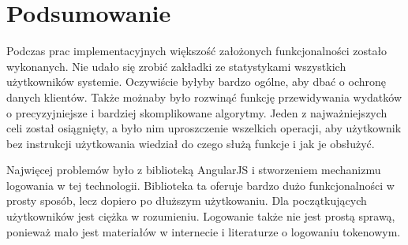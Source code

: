 \documentclass[10pt,titlepage]{article}
\begin{document}
\section*{Podsumowanie}
Podczas prac implementacyjnych większość założonych funkcjonalności zostało wykonanych. Nie udało się zrobić zakładki ze statystykami wszystkich użytkowników systemie. Oczywiście byłyby bardzo ogólne, aby dbać o ochronę danych klientów. Także możnaby było rozwinąć funkcję przewidywania wydatków o precyzyjniejsze i bardziej skomplikowane algorytmy. Jeden z najważniejszych celi został osiągnięty, a było nim uproszczenie wszelkich operacji, aby użytkownik bez instrukcji użytkowania wiedział do czego służą funkcje i jak je obsłużyć.
\par Najwięcej problemów było z biblioteką AngularJS i stworzeniem mechanizmu logowania w tej technologii. Biblioteka ta oferuje bardzo dużo funkcjonalności w prosty sposób, lecz dopiero po dłuższym użytkowaniu. Dla początkujących użytkowników jest ciężka w rozumieniu. Logowanie także nie jest prostą sprawą, ponieważ mało jest materiałów w internecie i literaturze o logowaniu tokenowym.





\end{document}
